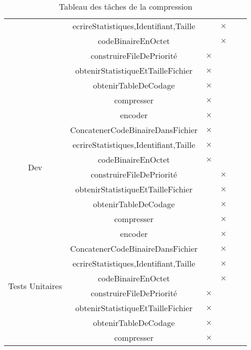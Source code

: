 \begin{table}[ht]
\begin{tabular}{|c|c|>{\centering\arraybackslash}p{1.5cm}|>{\centering\arraybackslash}p{1.5cm}|>{\centering\arraybackslash}p{1.5cm}|>{\centering\arraybackslash}p{1.5cm}|}
        \cline{2-6}
        & ecrireStatistiques,Identifiant,Taille & & $\times$ & & \\ 
        \cline{2-6}
        & codeBinaireEnOctet & & $\times$ & & \\
        \cline{2-6}
        & construireFileDePriorité & $\times$ & & &\\
        \cline{2-6}
        & obtenirStatistiqueEtTailleFichier & $\times$ & & & \\
        \cline{2-6}
        & obtenirTableDeCodage & $\times$ & & & \\
        \cline{2-6}
        & compresser & $\times$ & & &\\
        \hline
       \multirow{8}{*}{Dev}
        & encoder & $\times$ & & & \\
        \cline{2-6}
        & ConcatenerCodeBinaireDansFichier & $\times$ & & & \\
        \cline{2-6}
        & ecrireStatistiques,Identifiant,Taille & $\times$ & & & \\ 
        \cline{2-6}
        & codeBinaireEnOctet & $\times$ & & & \\
        \cline{2-6}
        & construireFileDePriorité & & $\times$ & & \\
        \cline{2-6}
        & obtenirStatistiqueEtTailleFichier & & $\times$ & & \\
        \cline{2-6}
        & obtenirTableDeCodage & & $\times$ & & \\
        \cline{2-6}
        & compresser & & $\times$ & & \\
        \hline
        \multirow{8}{*}{Tests Unitaires}
        & encoder & & $\times$ & & \\
        \cline{2-6}
        & ConcatenerCodeBinaireDansFichier & & $\times$ & & \\
        \cline{2-6}
        & ecrireStatistiques,Identifiant,Taille & & $\times$ & & \\ 
        \cline{2-6}
        & codeBinaireEnOctet & & $\times$ & & \\
        \cline{2-6}
        & construireFileDePriorité & $\times$ & & & \\
        \cline{2-6}
        & obtenirStatistiqueEtTailleFichier & $\times$ & & & \\
        \cline{2-6}
        & obtenirTableDeCodage & $\times$ & & & \\
        \cline{2-6}
        & compresser & $\times$ & & & \\
        \hline
    \end{tabular}
    \caption{Tableau des tâches de la compression}
  \end{table}  
 
